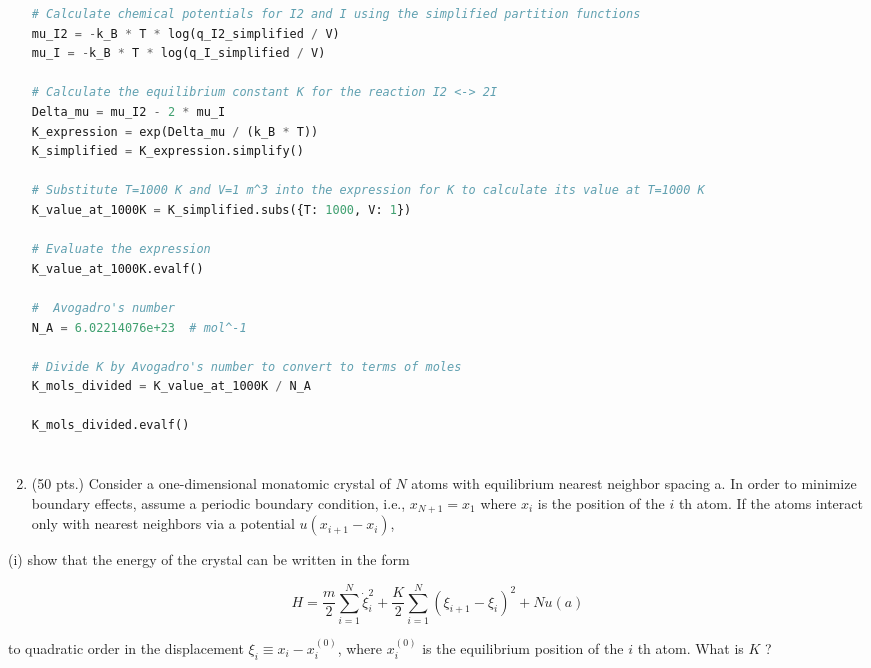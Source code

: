 \documentclass[12pt]{article}
\begin{document}
\begin{enumerate}
\begin{lstlisting}[language=Python]
# Calculate chemical potentials for I2 and I using the simplified partition functions
mu_I2 = -k_B * T * log(q_I2_simplified / V)
mu_I = -k_B * T * log(q_I_simplified / V)

# Calculate the equilibrium constant K for the reaction I2 <-> 2I
Delta_mu = mu_I2 - 2 * mu_I
K_expression = exp(Delta_mu / (k_B * T))
K_simplified = K_expression.simplify()

# Substitute T=1000 K and V=1 m^3 into the expression for K to calculate its value at T=1000 K
K_value_at_1000K = K_simplified.subs({T: 1000, V: 1})

# Evaluate the expression
K_value_at_1000K.evalf()

#  Avogadro's number
N_A = 6.02214076e+23  # mol^-1

# Divide K by Avogadro's number to convert to terms of moles
K_mols_divided = K_value_at_1000K / N_A

K_mols_divided.evalf()

\end{lstlisting}
\section{}
  \item (50 pts.) Consider a one-dimensional monatomic crystal of $N$ atoms with equilibrium nearest neighbor spacing a. In order to minimize boundary effects, assume a periodic boundary condition, i.e., $x_{N+1}=x_{1}$ where $x_{i}$ is the position of the $i$ th atom. If the atoms interact only with nearest neighbors via a potential $u\left(x_{i+1}-x_{i}\right)$,

\end{enumerate}

(i) show that the energy of the crystal can be written in the form


\begin{equation*}
H=\frac{m}{2} \sum_{i=1}^{N} \dot{\xi}_{i}^{2}+\frac{K}{2} \sum_{i=1}^{N}\left(\xi_{i+1}-\xi_{i}\right)^{2}+N u(a) \tag{6}
\end{equation*}


to quadratic order in the displacement $\xi_{i} \equiv x_{i}-x_{i}^{(0)}$, where $x_{i}^{(0)}$ is the equilibrium position of the $i$ th atom. What is $K$ ?
\subsection{}
\end{document}
